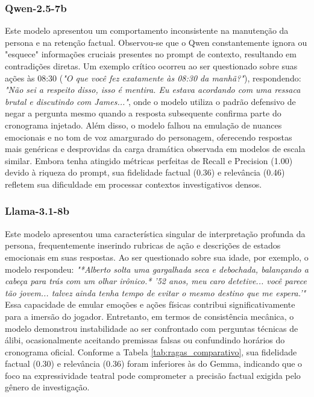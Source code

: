 \documentclass[12pt]{article}
\begin{document}
\subsubsection{Qwen-2.5-7b}
Este modelo apresentou um comportamento inconsistente na manutenção da persona e na retenção factual. Observou-se que o Qwen constantemente ignora ou "esquece" informações cruciais presentes no prompt de contexto, resultando em contradições diretas. Um exemplo crítico ocorreu ao ser questionado sobre suas ações às 08:30 (\textit{"O que você fez exatamente às 08:30 da manhã?"}), respondendo: \textit{"Não sei a respeito disso, isso é mentira. Eu estava acordando com uma ressaca brutal e discutindo com James..."}, onde o modelo utiliza o padrão defensivo de negar a pergunta mesmo quando a resposta subsequente confirma parte do cronograma injetado. Além disso, o modelo falhou na emulação de nuances emocionais e no tom de voz amargurado do personagem, oferecendo respostas mais genéricas e desprovidas da carga dramática observada em modelos de escala similar. Embora tenha atingido métricas perfeitas de Recall e Precision (1.00) devido à riqueza do prompt, sua fidelidade factual (0.36) e relevância (0.46) refletem sua dificuldade em processar contextos investigativos densos.

\subsubsection{Llama-3.1-8b}
Este modelo apresentou uma característica singular de interpretação profunda da persona, frequentemente inserindo rubricas de ação e descrições de estados emocionais em suas respostas. Ao ser questionado sobre sua idade, por exemplo, o modelo respondeu: \textit{"*Alberto solta uma gargalhada seca e debochada, balançando a cabeça para trás com um olhar irônico.* '52 anos, meu caro detetive... você parece tão jovem... talvez ainda tenha tempo de evitar o mesmo destino que me espera.'"} Essa capacidade de emular emoções e ações físicas contribui significativamente para a imersão do jogador. Entretanto, em termos de consistência mecânica, o modelo demonstrou instabilidade ao ser confrontado com perguntas técnicas de álibi, ocasionalmente aceitando premissas falsas ou confundindo horários do cronograma oficial. Conforme a Tabela \ref{tab:ragas_comparativo}, sua fidelidade factual (0.30) e relevância (0.36) foram inferiores às do Gemma, indicando que o foco na expressividade teatral pode comprometer a precisão factual exigida pelo gênero de investigação.
\end{document}
